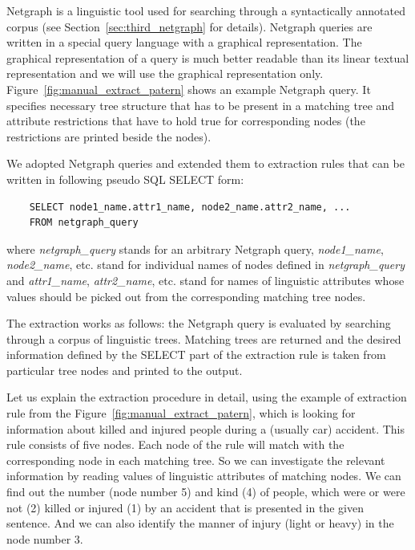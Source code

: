 Netgraph is a linguistic tool used for searching through a syntactically annotated corpus (see Section~\ref{sec:third_netgraph} for details). Netgraph queries are written in a special query language with a graphical representation. The graphical representation of a query is much better readable than its linear textual representation and we will use the graphical representation only. Figure~\ref{fig:manual_extract_patern} shows an example Netgraph query. It specifies necessary tree structure that has to be present in a matching tree and attribute restrictions that have to hold true for corresponding nodes (the restrictions are printed beside the nodes).



We adopted Netgraph queries and extended them to extraction rules that can be written in following pseudo SQL SELECT form:


\begin{verbatim}
	SELECT node1_name.attr1_name, node2_name.attr2_name, ... 
	FROM netgraph_query
\end{verbatim}

where \emph{netgraph\_query} stands for an arbitrary Netgraph query, \emph{node1\_name}, \emph{node2\_name}, etc. stand for individual names of nodes defined in \emph{netgraph\_query} and \emph{attr1\_name}, \emph{attr2\_name}, etc. stand for names of linguistic attributes whose values should be picked out from the corresponding matching tree nodes.

The extraction works as follows: the Netgraph query is evaluated by searching through a corpus of linguistic trees. Matching trees are returned and the desired information defined by the SELECT part of the extraction rule is taken from particular tree nodes and printed to the output.

Let us explain the extraction procedure in detail, using the example of extraction rule from the Figure~\ref{fig:manual_extract_patern}, which is looking for information about killed and injured people during a (usually car) accident. This rule consists of five nodes. Each node of the rule will match with the corresponding node in each matching tree. So we can investigate the relevant information by reading values of linguistic attributes of matching nodes. We can find out the number (node number 5) and kind (4) of people, which were or were not (2) killed or injured (1) by an accident that is presented in the given sentence. And we can also identify the manner of injury (light or heavy) in the node number 3.

